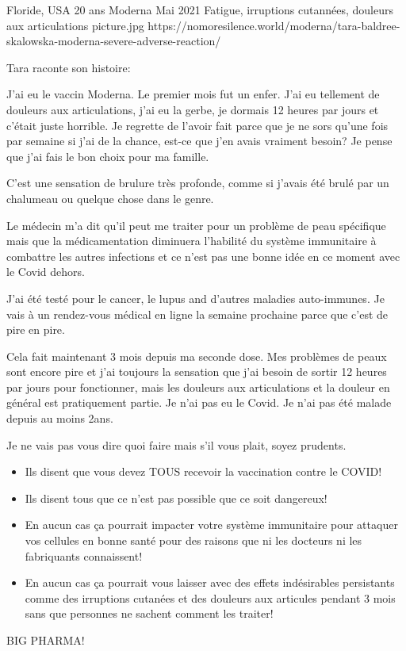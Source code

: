 {Floride, USA}
{20 ans}
{Moderna}
{Mai 2021}
{Fatigue, irruptions cutannées, douleurs aux articulations}
{picture.jpg}
{https://nomoresilence.world/moderna/tara-baldree-skalowska-moderna-severe-adverse-reaction/}
{

Tara raconte son histoire:

J'ai eu le vaccin Moderna. Le premier mois fut un enfer. J'ai eu tellement de
douleurs aux articulations, j'ai eu la gerbe, je dormais 12 heures par jours et
c'était juste horrible. Je regrette de l'avoir fait parce que je ne sors qu'une
fois par semaine si j'ai de la chance, est-ce que j'en avais vraiment besoin? Je
pense que j'ai fais le bon choix pour ma famille.

C'est une sensation de brulure très profonde, comme si j'avais été brulé par un
chalumeau ou quelque chose dans le genre.

Le médecin m'a dit qu'il peut me traiter pour un problème de peau spécifique
mais que la médicamentation diminuera l'habilité du système immunitaire à
combattre les autres infections et ce n'est pas une bonne idée en ce moment avec
le Covid dehors.

J'ai été testé pour le cancer, le lupus and d'autres maladies auto-immunes. Je
vais à un rendez-vous médical en ligne la semaine prochaine parce que c'est de
pire en pire.

Cela fait maintenant 3 mois depuis ma seconde dose. Mes problèmes de peaux sont
encore pire et j'ai toujours la sensation que j'ai besoin de sortir 12 heures
par jours pour fonctionner, mais les douleurs aux articulations et la douleur en
général est pratiquement partie. Je n'ai pas eu le Covid. Je n'ai pas été malade
depuis au moins 2ans.

Je ne vais pas vous dire quoi faire mais s'il vous plait, soyez prudents.

\begin{itemize}
  
\item Ils disent que vous devez TOUS recevoir la vaccination contre le COVID!
  
\item Ils disent tous que ce n'est pas possible que ce soit dangereux!
  
\item En aucun cas ça pourrait impacter votre système immunitaire pour attaquer
  vos cellules en bonne santé pour des raisons que ni les docteurs ni les
  fabriquants connaissent!
  
\item En aucun cas ça pourrait vous laisser avec des effets indésirables
  persistants comme des irruptions cutanées et des douleurs aux articules
  pendant 3 mois sans que personnes ne sachent comment les traiter!
  
\end{itemize}
  
BIG PHARMA!

}
